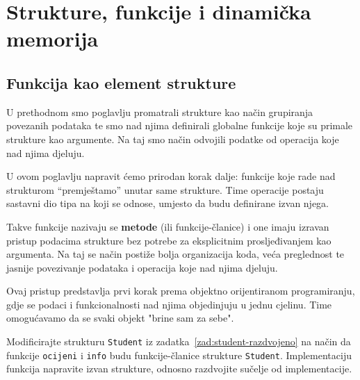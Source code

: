 \chapter{Strukture, funkcije i dinamička memorija}


\section{Funkcija kao element strukture}
U prethodnom smo poglavlju promatrali strukture kao način grupiranja povezanih podataka te smo nad njima definirali globalne funkcije koje su primale strukture kao argumente. Na taj smo način odvojili podatke od operacija koje nad njima djeluju.

U ovom poglavlju napravit ćemo prirodan korak dalje: funkcije koje rade nad strukturom “premještamo” unutar same strukture. Time operacije postaju sastavni dio tipa na koji se odnose, umjesto da budu definirane izvan njega.

Takve funkcije nazivaju se \textbf{metode} (ili funkcije-članice) i one imaju izravan pristup podacima strukture bez potrebe za eksplicitnim prosljeđivanjem kao argumenta. Na taj se način postiže bolja organizacija koda, veća preglednost te jasnije povezivanje podataka i operacija koje nad njima djeluju.

Ovaj pristup predstavlja prvi korak prema objektno orijentiranom programiranju, gdje se podaci i funkcionalnosti nad njima objedinjuju u jednu cjelinu. Time omogućavamo da se svaki objekt "brine sam za sebe".



\begin{zadatak}\label{zad:student-funkcije-unutar}
    Modificirajte strukturu \texttt{Student} iz zadatka~\ref{zad:student-razdvojeno} na način da funkcije \texttt{ocijeni} i \texttt{info} budu funkcije-članice strukture \texttt{Student}. Implementaciju funkcija napravite izvan strukture, odnosno razdvojite sučelje od implementacije.
\end{zadatak}

